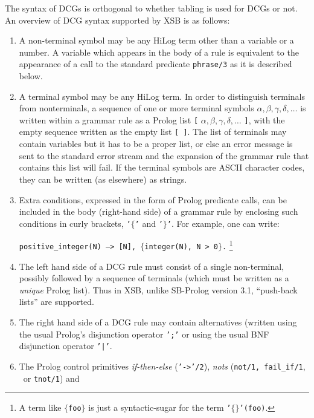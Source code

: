 The syntax of DCGs is orthogonal to whether tabling is used for DCGs
or not.  An overview of DCG syntax
 supported by XSB is as follows:
\begin{enumerate}
\item A non-terminal symbol may be any HiLog term other than a variable
      or a number. A variable which appears in the body of a rule is
      equivalent to the appearance of a call to the standard predicate
      {\tt phrase/3} as it is described below.
\item A terminal symbol may be any HiLog term. In order to distinguish 
      terminals from nonterminals, a sequence of one or more terminal
      symbols   $\alpha, \beta, \gamma, \delta, \ldots$
      is written within a grammar rule as a Prolog list 
         {\tt [} $\alpha, \beta, \gamma, \delta, \ldots$ {\tt ]},
      with the empty sequence written as the empty list {\tt [\,]}.
      The list of terminals may contain variables but it has to be a 
      proper list, or else an error message is sent to the standard 
      error stream and the expansion of the grammar rule that contains 
      this list will fail. If the terminal symbols are ASCII character
      codes, they can be written (as elsewhere) as strings.
\item Extra conditions, expressed in the form of Prolog predicate calls, 
      can be included in the body (right-hand side) of a grammar rule by 
      enclosing such conditions in curly brackets, {\tt '$\{$'} and
      {\tt '$\}$'}.
      For example, one can write:
      \begin{center}
                {\tt positive\_integer(N) --> [N], $\{$integer(N), N > 0$\}$.}
                \footnote{A term like {\tt $\{$foo$\}$} is just a
			  syntactic-sugar for the term {\tt '$\{\}$'(foo)}.}
      \end{center}
\item The left hand side of a DCG rule must consist of a single non-terminal,
      possibly followed by a sequence of terminals (which must be written as
      a {\em unique} Prolog list). Thus in XSB, unlike SB-Prolog 
      version 3.1, ``push-back lists'' are supported.
\item The right hand side of a DCG rule may contain alternatives (written 
      using the usual Prolog's disjunction operator {\tt ';'} or 
      using the usual BNF disjunction operator {\tt '|'}. 
\item The Prolog control primitives {\em if-then-else} ({\tt '->'/2}),
      {\em nots} ({\tt not/1, fail\_if/1}, \not\ or {\tt tnot/1}) and 

\end{enumerate}
